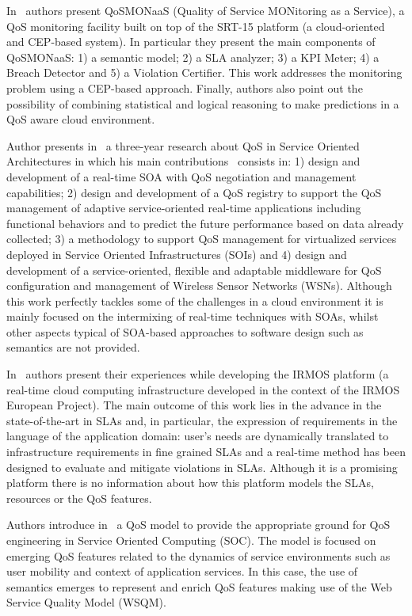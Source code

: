In~\cite{srt-15} authors present QoSMONaaS (Quality of Service MONitoring as a Service), 
a QoS monitoring facility built on top of the SRT-15 platform (a cloud-oriented and CEP-based system). 
In particular they present the main components of QoSMONaaS: 1) a semantic model; 2) a SLA analyzer; 3) a KPI Meter; 4) a Breach Detector and 
5) a Violation Certifier. This work addresses the monitoring problem using 
a CEP-based approach. Finally, authors also point out the possibility of combining statistical and 
logical reasoning to make predictions in a QoS aware cloud environment.


Author presents in~\cite{anastasi2011} a three-year research about QoS in Service Oriented Architectures 
in which his main contributions~\cite{cucinottaSOA_IA09,Konstanteli:2009:RGF:1632706.1633120,DBLP:conf/compsac/CucinottaAA09} 
consists in: 1) design and development of a real-time SOA with QoS negotiation and management 
capabilities; 2) design and development of a QoS registry to support the QoS management of 
adaptive service-oriented real-time applications including functional behaviors and to predict 
the future performance based on data already collected; 3) a methodology to support 
QoS management for virtualized services deployed in Service Oriented Infrastructures (SOIs) and 
4) design and development of a service-oriented, flexible and adaptable middleware for QoS 
configuration and management of Wireless Sensor Networks (WSNs). Although this work perfectly tackles 
some of the challenges in a cloud environment it is mainly focused on the intermixing of real-time 
techniques with SOAs, whilst other aspects typical of SOA-based approaches to 
software design such as semantics are not provided.


In~\cite{DBLP:conf/compsac/CucinottaAA10} authors present their experiences while developing the IRMOS platform (a real-time cloud computing infrastructure developed in the context of the IRMOS European Project). 
The main outcome of this work lies in the advance in the state-of-the-art in SLAs and, in particular, the expression of requirements 
in the language of the application domain: user's  needs are dynamically translated to infrastructure requirements in fine 
grained SLAs and a real-time method has been designed to evaluate and mitigate violations in SLAs. Although it is a 
promising platform there is no information about how this platform models the SLAs, resources or the QoS features.


Authors introduce in~\cite{Mabrouk:2009:SEQ:1564601.1564724} a QoS model to provide the appropriate ground for QoS 
engineering in Service Oriented Computing (SOC). The model is focused on 
emerging QoS features related to the dynamics of service environments such as 
user mobility and context of application services. In this case, the use of semantics emerges 
to represent and enrich QoS features making use of the Web Service Quality Model (WSQM).

